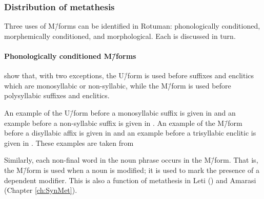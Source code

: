 \subsubsection{Distribution of metathesis}\label{sec:RotFun}
Three uses of M\=/forms can be identified in Rotuman:
phonologically conditioned, morphemically conditioned, and morphological.
Each is discussed in turn.

\paragraph{Phonologically conditioned M\=/forms}\label{sec:RotPhoConMfo}
\citet{haki98} show that, with two exceptions,
the U\=/form is used before suffixes and enclitics
which are monosyllabic or non-syllabic,
while the M\=/form is used before polysyllabic suffixes and enclitics.

An example of the U\=/form before a monosyllabic suffix is given in 
and an example before a non-syllabic suffix is given in .
An example of the M\=/form before a disyllabic affix is given in 
and an example before a trisyllabic enclitic is given in .
These examples are taken from \cite[120f]{haki98}

\begin{exe}\let\eachwordone=\itshape
	\label{RotUse1}
	\label{RotUse2}
	\label{RotUse3}
	\label{RotUse4}
\end{exe}

Similarly, each non-final word in the noun phrase occurs in the M\=/form.
That is, the M\=/form is used when a noun is modified;
it is used to mark the presence of a dependent modifier.
This is also a function of metathesis in Leti ()
and Amarasi (Chapter \ref{ch:SynMet}).

